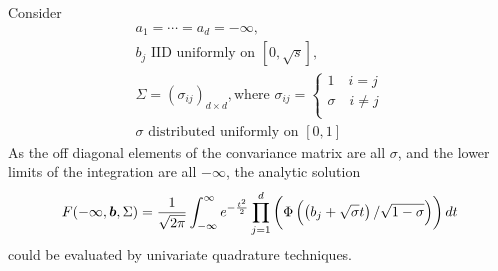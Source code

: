 \documentclass{iitthesis}
\begin{document}
Consider 
\begin{subequations} \label{MVNPexp1param}
\begin{gather}
a_1=\cdots=a_d =-\infty,\\
b_j \text{ IID uniformly on } [0,\sqrt{s}],\\
\Sigma = (\sigma_{ij})_{d\times d}, \text{where } \sigma_{ij} =  
  \begin{cases}
    1 \quad i=j \\
    \sigma \quad i \neq j \\
  \end{cases}\\
\sigma \text{ distributed uniformly on } [0,1]
\end{gather}
\end{subequations}
As the off diagonal elements of the convariance matrix are all $\sigma$, and the lower limits of the integration are all $-\infty$, the analytic solution
\begin{align}\label{truesolMVNP}
F(-\infty, \boldsymbol{b},\Sigma) = \frac{1}{\sqrt{2\pi}}\int_{-\infty}^{\infty} e^{-\frac{t^2}{2}} \prod_{j=1}^d \left(\Phi\left(\left(b_j+\sqrt{\sigma}t\right)/\sqrt{1-\sigma}\right)\right)dt
\end{align}
could be evaluated by univariate quadrature techniques.
\end{document}
